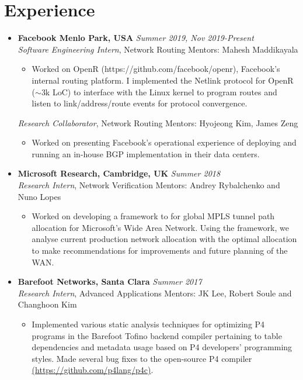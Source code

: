 \documentclass[11pt,a4paper,sans]{moderncv}        %
\begin{document}
\section{Experience}
\begin{itemize}
	\item \textbf{Facebook Menlo Park, USA} \hfill \emph{Summer 2019, Nov 2019-Present} \\
	\emph{Software Engineering Intern}, Network Routing \hfill Mentors: Mahesh Maddikayala
	\begin{itemize}
		\item Worked on OpenR (https://github.com/facebook/openr), Facebook's internal routing platform. I implemented the
		Netlink protocol for OpenR ($\sim$3k LoC) to interface with the Linux kernel to program routes and listen to link/address/route events
		for protocol convergence.
	\end{itemize}
	\emph{Research Collaborator}, Network Routing \hfill Mentors: Hyojeong Kim, James Zeng
	\begin{itemize}
		\item Worked on presenting Facebook's operational experience of
		deploying and running an in-house BGP implementation in their data centers.
	\end{itemize}
	\vspace*{6pt}

	\item \textbf{Microsoft Research, Cambridge, UK} \hfill \emph{Summer 2018} \\
	\emph{Research Intern}, Network Verification \hfill Mentors: Andrey Rybalchenko and Nuno Lopes
	\begin{itemize}
		\item Worked on developing a framework to for global MPLS tunnel path allocation for Microsoft's
		Wide Area Network. Using the framework, we analyse current production network allocation with
		the optimal allocation to make recommendations for improvements and future planning of the WAN.
	\end{itemize}
	\vspace*{6pt}

	\item \textbf{Barefoot Networks, Santa Clara} \hfill \emph{Summer 2017} \\
	\emph{Research Intern}, Advanced Applications \hfill Mentors: JK Lee, Robert Soule and Changhoon Kim
	\begin{itemize}
		\item Implemented various static analysis techniques for optimizing P4 programs in the Barefoot Tofino backend compiler
		pertaining to table dependencies and metadata usage based on P4
		developers' programming styles. Made several
		bug fixes to the open-source P4 compiler \href{https://github.com/p4lang/p4c}{(https://github.com/p4lang/p4c)}.
	\end{itemize}
	\vspace*{6pt}


\end{itemize}
\end{document}
